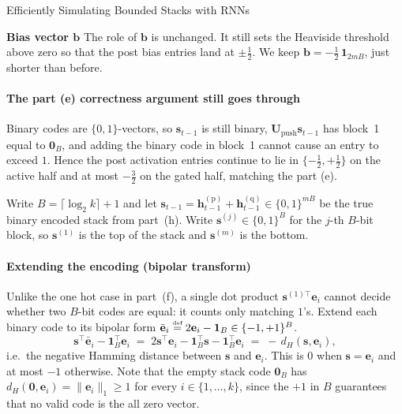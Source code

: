 \begin{question}{Efficiently Simulating Bounded Stacks with RNNs}
\begin{subquestion}
    \textbf{Bias vector $\mathbf{b}$} The role of $\mathbf{b}$ is unchanged. 
    It still sets the Heaviside threshold above zero so that the post bias entries land at $\pm\tfrac{1}{2}$. 
    We keep $\mathbf{b} = -\tfrac{1}{2}\,\mathbf{1}_{2mB}$, just shorter than before.

    \paragraph{The part (e) correctness argument still goes through} Binary codes are $\{0, 1\}$-vectors, so $\mathbf{s}_{t-1}$ is still binary, $\mathbf{U}_{\text{push}}\mathbf{s}_{t-1}$ has block~1 equal to $\mathbf{0}_B$, and adding the binary code in block~1 cannot cause an entry to exceed $1$. 
    Hence the post activation entries continue to lie in $\{-\tfrac{1}{2}, +\tfrac{1}{2}\}$ on the active half and at most $-\tfrac{3}{2}$ on the gated half, matching the part (e).
\end{subquestion}

\begin{subquestion}
    Write $B = \lceil \log_2 k \rceil + 1$ and let $\mathbf{s}_{t-1} = \mathbf{h}_{t-1}^{(\text{p})} + \mathbf{h}_{t-1}^{(\text{q})} \in \{0, 1\}^{mB}$ be the true binary encoded stack from part~(h). 
    Write $\mathbf{s}^{(j)} \in \{0, 1\}^{B}$ for the $j$-th $B$-bit block, so $\mathbf{s}^{(1)}$ is the top of the stack and $\mathbf{s}^{(m)}$ is the bottom.

    \paragraph{Extending the encoding (bipolar transform)} Unlike the one hot case in part~(f), a single dot product $\mathbf{s}^{(1)\top}\mathbf{e}_i$ cannot decide whether two $B$-bit codes are equal: it counts only matching $1$'s. 
    Extend each binary code to its bipolar form $\bar{\mathbf{e}}_i \mathrel{\stackrel{\textnormal{\tiny def}}{=}} 2\mathbf{e}_i - \mathbf{1}_B \in \{-1, +1\}^{B}$.
    \[
        \mathbf{s}^\top \bar{\mathbf{e}}_i - \mathbf{1}_B^\top \mathbf{e}_i \;=\; 2\mathbf{s}^\top\mathbf{e}_i - \mathbf{1}_B^\top\mathbf{s} - \mathbf{1}_B^\top\mathbf{e}_i \;=\; -\,d_H(\mathbf{s}, \mathbf{e}_i),
    \]
    i.e.\ the negative Hamming distance between $\mathbf{s}$ and $\mathbf{e}_i$. 
    This is $0$ when $\mathbf{s} = \mathbf{e}_i$ and at most $-1$ otherwise. 
    Note that the empty stack code $\mathbf{0}_B$ has $d_H(\mathbf{0}, \mathbf{e}_i) = \|\mathbf{e}_i\|_1 \ge 1$ for every $i \in \{1, \dots, k\}$, since the $+1$ in $B$ guarantees that no valid code is the all zero vector.


\end{subquestion}
\end{question}

